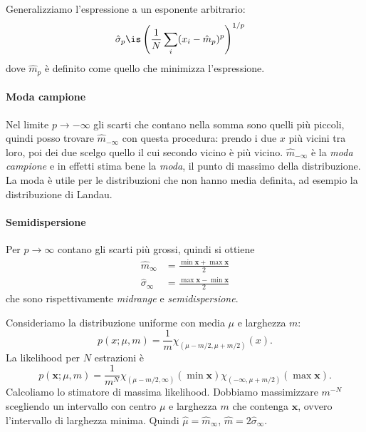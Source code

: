Generalizziamo l'espressione a un esponente arbitrario:
\begin{align*}
	\hat\sigma_p
	&\is \left(\frac1N \sum_i (x_i - \hat m_p)^p\right)^{1/p}
\end{align*}
dove $\hat m_p$ è definito come quello che minimizza l'espressione.

\paragraph{Moda campione}

Nel limite $p\to-\infty$ gli scarti che contano nella somma sono quelli più piccoli,
quindi posso trovare $\hat m_{-\infty}$ con questa procedura:
prendo i due $x$ più vicini tra loro, poi dei due scelgo quello il cui secondo vicino è più vicino.
$\hat m_{-\infty}$ è la \emph{moda campione} e in effetti stima bene la \emph{moda},
il punto di massimo della distribuzione.
La moda è utile per le distribuzioni che non hanno media definita,
ad esempio la distribuzione di Landau.


\paragraph{Semidispersione}

Per $p\to\infty$ contano gli scarti più grossi,
quindi si ottiene
\begin{align*}
	\hat m_\infty
	&= \frac{\min\mathbf x + \max\mathbf x}2 \\
	\hat\sigma_\infty
	&= \frac{\max\mathbf x - \min\mathbf x}2
\end{align*}
che sono rispettivamente \emph{midrange} e \emph{semidispersione}.
\begin{example}
	Consideriamo la distribuzione uniforme con media $\mu$ e larghezza $m$:
	\begin{equation*}
		p(x;\mu,m)
		= \frac1m \chi_{(\mu-m/2,\mu+m/2)}(x).
	\end{equation*}
	La likelihood per $N$ estrazioni è
	\begin{equation*}
		p(\mathbf x;\mu,m)
		= \frac1{m^N} \chi_{(\mu-m/2,\infty)}(\min\mathbf x) \chi_{(-\infty,\mu+m/2)}(\max\mathbf x).
	\end{equation*}
	Calcoliamo lo stimatore di massima likelihood.
	Dobbiamo massimizzare $m^{-N}$ scegliendo un intervallo con centro $\mu$ e larghezza $m$ che contenga $\mathbf x$,
	ovvero l'intervallo di larghezza minima.
	Quindi $\hat\mu=\hat m_\infty$, $\hat m=2\hat\sigma_\infty$.
\end{example}

